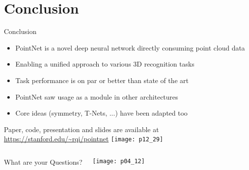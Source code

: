 \section{Conclusion}

\begin{frame}[c]{Conclusion}
    \begin{multicols}{2}
        \begin{itemize}
            \item PointNet is a novel deep neural network directly consuming point cloud data
            \item Enabling a unified approach to various 3D recognition tasks
            \item Task performance is on par or better than state of the art
            \item PointNet saw usage as a module in other architectures
            \item Core ideas (symmetry, T-Nets, ...) have been adapted too
        \end{itemize}
        Paper, code, presentation and slides are available at \url{https://stanford.edu/~rqi/pointnet}
        \texttt{[image: p12\_29]}
    \end{multicols}
\end{frame}


\begin{frame}[c]
    \Huge
    \begin{columns}
        \begin{centering}
            What are your Questions?
        \end{centering}
        \texttt{[image: p04\_12]}
    \end{columns}
\end{frame}
